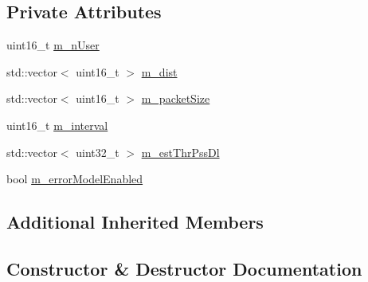 \subsection*{Private Attributes}
\begin{DoxyCompactItemize}
\item 
uint16\+\_\+t \hyperlink{classLenaPssFfMacSchedulerTestCase2_a4d4431bc9cfea75e5f20c9aec63b97fe}{m\+\_\+n\+User}
\item 
std\+::vector$<$ uint16\+\_\+t $>$ \hyperlink{classLenaPssFfMacSchedulerTestCase2_afef642ef7109b14e75e78696f65febe2}{m\+\_\+dist}
\item 
std\+::vector$<$ uint16\+\_\+t $>$ \hyperlink{classLenaPssFfMacSchedulerTestCase2_a91fce939c11d7abd86121e57485d8027}{m\+\_\+packet\+Size}
\item 
uint16\+\_\+t \hyperlink{classLenaPssFfMacSchedulerTestCase2_a80853226f76f2201046d2e6c799680ac}{m\+\_\+interval}
\item 
std\+::vector$<$ uint32\+\_\+t $>$ \hyperlink{classLenaPssFfMacSchedulerTestCase2_af6cfa8e9f57d7db307a1eade0cbe80cb}{m\+\_\+est\+Thr\+Pss\+Dl}
\item 
bool \hyperlink{classLenaPssFfMacSchedulerTestCase2_a0fe80fb7f4883b94e65d884651e6e404}{m\+\_\+error\+Model\+Enabled}
\end{DoxyCompactItemize}
\subsection*{Additional Inherited Members}


\subsection{Constructor \& Destructor Documentation}
